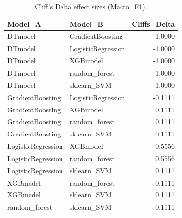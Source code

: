 \begin{table}[t]
\centering
\begin{tabular}{llr}
\toprule
Model_A & Model_B & Cliffs_Delta \\
\midrule
DTmodel & GradientBoosting & -1.0000 \\
DTmodel & LogisticRegression & -1.0000 \\
DTmodel & XGBmodel & -1.0000 \\
DTmodel & random_forest & -1.0000 \\
DTmodel & sklearn_SVM & -1.0000 \\
GradientBoosting & LogisticRegression & -0.1111 \\
GradientBoosting & XGBmodel & 0.1111 \\
GradientBoosting & random_forest & 0.1111 \\
GradientBoosting & sklearn_SVM & -0.1111 \\
LogisticRegression & XGBmodel & 0.5556 \\
LogisticRegression & random_forest & 0.5556 \\
LogisticRegression & sklearn_SVM & 0.1111 \\
XGBmodel & random_forest & 0.1111 \\
XGBmodel & sklearn_SVM & 0.1111 \\
random_forest & sklearn_SVM & -0.1111 \\
\bottomrule
\end{tabular}
\caption{Cliff's Delta effect sizes (Macro_F1).}
\label{tab:cliffs_Macro_F1}
\end{table}